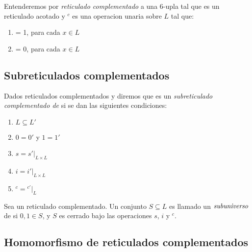   \begin{definition}
    Entenderemos por \emph{reticulado complementado} a una 6-upla \reticulCompl tal que \reticulAcot es un
    reticulado acotado y ${}^c$ es una operacion unaria sobre $L$ tal que:
    \begin{enumerate}
      \item {} = 1, para cada $x \in L$
      \item {} = 0, para cada $x \in L$
    \end{enumerate}
  \end{definition}

  \subsection{Subreticulados complementados}
  \begin{definition}
    Dados reticulados complementados \reticulCompl y  diremos que
    \reticulCompl es un \emph{subreticulado complementado de}  si se
    dan las siguientes condiciones:
    \begin{enumerate}
      \item $L \subseteq L'$
      \item $0 = 0'$ y $1 = 1'$
      \item $s = s'\vert_{L \times L}$
      \item $i = i'\vert_{L \times L}$
      \item ${}^c = {}^{c'}\vert_L$
    \end{enumerate}

    Sea \reticulCompl un reticulado complementado. Un conjunto $S \subseteq L$ es llamado un $\emph{subuniverso}$ de
    \reticulCompl si $0, 1 \in S$, y $S$ es cerrado bajo las operaciones $s$, $i$ y ${}^c$.
  \end{definition}

  \subsection{Homomorfismo de reticulados complementados}

